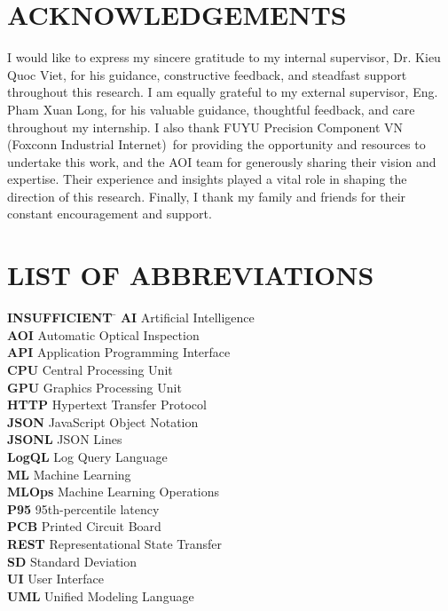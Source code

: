 \documentclass[12pt,a4paper]{article}
\newcommand{\usthexternalsupervisor}{Eng. Pham Xuan Long}
\newcommand{\usthinternalsupervisor}{Dr. Kieu Quoc Viet}
\newcommand{\usthcompany}{FUYU Precision Component VN (Foxconn Industrial Internet)}
\begin{document}
\section*{ACKNOWLEDGEMENTS}
I would like to express my sincere gratitude to my internal supervisor,
\usthinternalsupervisor, for his guidance, constructive feedback, and steadfast
support throughout this research. I am equally grateful to my external supervisor,
\usthexternalsupervisor, for his valuable guidance, thoughtful feedback, and care
throughout my internship. I also thank \usthcompany\ for providing the opportunity
and resources to undertake this work, and the AOI team for generously sharing their
vision and expertise. Their experience and insights played a vital role in shaping
the direction of this research. Finally, I thank my family and friends for their
constant encouragement and support.
\clearpage

\section*{LIST OF ABBREVIATIONS}
\begin{tabbing}
\textbf{INSUFFICIENT} \= \kill
\textbf{AI}     \> Artificial Intelligence \\
\textbf{AOI}    \> Automatic Optical Inspection \\
\textbf{API}    \> Application Programming Interface \\
\textbf{CPU}    \> Central Processing Unit \\
\textbf{GPU}    \> Graphics Processing Unit \\
\textbf{HTTP}   \> Hypertext Transfer Protocol \\
\textbf{JSON}   \> JavaScript Object Notation \\
\textbf{JSONL}  \> JSON Lines \\
\textbf{LogQL}  \> Log Query Language \\
\textbf{ML}     \> Machine Learning \\
\textbf{MLOps}  \> Machine Learning Operations \\
\textbf{P95}    \> 95th-percentile latency \\
\textbf{PCB}    \> Printed Circuit Board \\
\textbf{REST}   \> Representational State Transfer \\
\textbf{SD}     \> Standard Deviation \\
\textbf{UI}     \> User Interface \\
\textbf{UML}    \> Unified Modeling Language \\
\end{tabbing}
\clearpage
\end{document}
